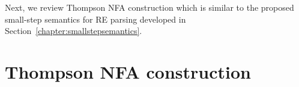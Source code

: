 \documentclass[oneside,12pt]{scrbook}
\theoremstyle{definition}
\theoremstyle{plain}
\theoremstyle{definition}
\begin{document}

Next, we review Thompson NFA construction which is similar to the proposed small-step semantics
for RE parsing developed in Section~\ref{chapter:smallstepsemantics}.

\section{Thompson NFA construction}
\label{subsection:thompsonnfraconstruction}
\end{document}
